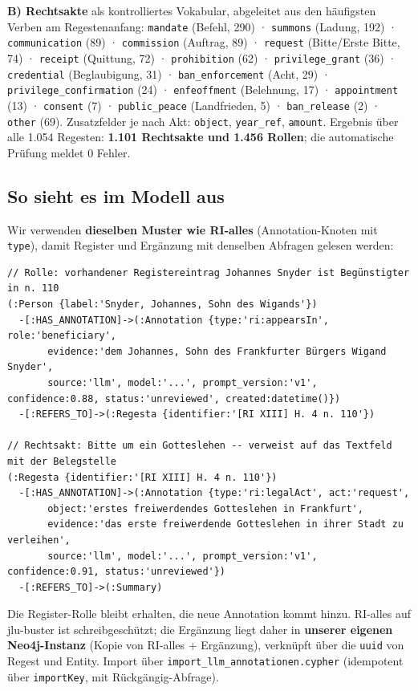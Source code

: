 \documentclass[10pt,a4paper]{article}
\newcommand{\code}[1]{\texttt{\small #1}}
\begin{document}
\medskip
\textbf{B) Rechtsakte} als kontrolliertes Vokabular, abgeleitet aus den häufigsten Verben am Regestenanfang:
\code{mandate} (Befehl, 290) · \code{summons} (Ladung, 192) · \code{communication} (89) · \code{commission} (Auftrag, 89) · \code{request} (Bitte/Erste Bitte, 74) · \code{receipt} (Quittung, 72) · \code{prohibition} (62) · \code{privilege\_grant} (36) · \code{credential} (Beglaubigung, 31) · \code{ban\_enforcement} (Acht, 29) · \code{privilege\_confirmation} (24) · \code{enfeoffment} (Belehnung, 17) · \code{appointment} (13) · \code{consent} (7) · \code{public\_peace} (Landfrieden, 5) · \code{ban\_release} (2) · \code{other} (69). Zusatzfelder je nach Akt: \code{object}, \code{year\_ref}, \code{amount}.
Ergebnis über alle 1.054 Regesten: \textbf{1.101 Rechtsakte und 1.456 Rollen}; die automatische Prüfung meldet 0 Fehler.

\subsection{So sieht es im Modell aus}

Wir verwenden \textbf{dieselben Muster wie RI-alles} (Annotation-Knoten mit \code{type}), damit Register und Ergänzung mit denselben Abfragen gelesen werden:

\begin{lstlisting}
// Rolle: vorhandener Registereintrag Johannes Snyder ist Begünstigter in n. 110
(:Person {label:'Snyder, Johannes, Sohn des Wigands'})
  -[:HAS_ANNOTATION]->(:Annotation {type:'ri:appearsIn', role:'beneficiary',
       evidence:'dem Johannes, Sohn des Frankfurter Bürgers Wigand Snyder',
       source:'llm', model:'...', prompt_version:'v1', confidence:0.88, status:'unreviewed', created:datetime()})
  -[:REFERS_TO]->(:Regesta {identifier:'[RI XIII] H. 4 n. 110'})

// Rechtsakt: Bitte um ein Gotteslehen -- verweist auf das Textfeld mit der Belegstelle
(:Regesta {identifier:'[RI XIII] H. 4 n. 110'})
  -[:HAS_ANNOTATION]->(:Annotation {type:'ri:legalAct', act:'request',
       object:'erstes freiwerdendes Gotteslehen in Frankfurt',
       evidence:'das erste freiwerdende Gotteslehen in ihrer Stadt zu verleihen',
       source:'llm', model:'...', prompt_version:'v1', confidence:0.91, status:'unreviewed'})
  -[:REFERS_TO]->(:Summary)
\end{lstlisting}

Die Register-Rolle bleibt erhalten, die neue Annotation kommt hinzu. RI-alles auf jlu-buster ist schreibgeschützt; die Ergänzung liegt daher in \textbf{unserer eigenen Neo4j-Instanz} (Kopie von RI-alles + Ergänzung), verknüpft über die \code{uuid} von Regest und Entity. Import über \code{import\_llm\_annotationen.cypher} (idempotent über \code{importKey}, mit Rückgängig-Abfrage).
\end{document}
